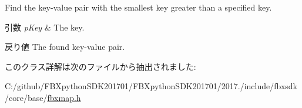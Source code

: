 Find the key-\/value pair with the smallest key greater than a specified key. 
\begin{DoxyParams}{引数}
{\em p\+Key} & The key. \\
\hline
\end{DoxyParams}
\begin{DoxyReturn}{戻り値}
The found key-\/value pair. 
\end{DoxyReturn}


このクラス詳解は次のファイルから抽出されました\+:\begin{DoxyCompactItemize}
\item 
C\+:/github/\+F\+B\+Xpython\+S\+D\+K201701/\+F\+B\+Xpython\+S\+D\+K201701/2017./include/fbxsdk/core/base/\hyperlink{fbxmap_8h}{fbxmap.\+h}\end{DoxyCompactItemize}
